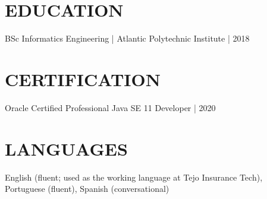 \documentclass[11pt,a4paper]{article}
\begin{document}
\section*{EDUCATION}
BSc Informatics Engineering | Atlantic Polytechnic Institute | 2018

\section*{CERTIFICATION}
Oracle Certified Professional Java SE 11 Developer | 2020

\section*{LANGUAGES}
English (fluent; used as the working language at Tejo Insurance Tech), Portuguese (fluent), Spanish (conversational)
\end{document}
